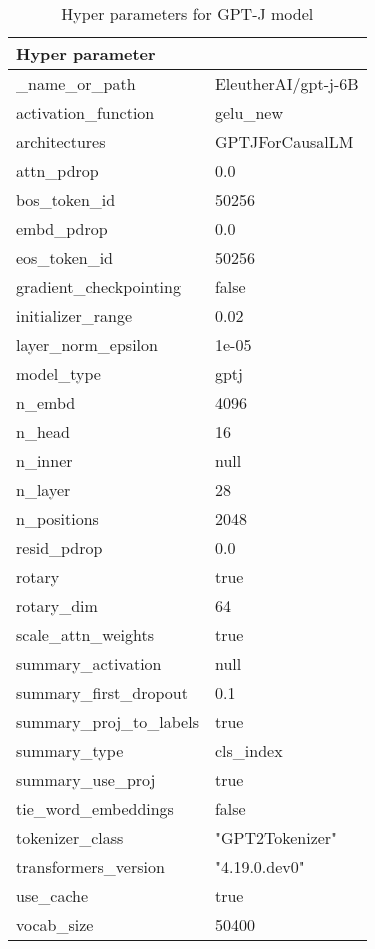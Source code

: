 \begin{table}
    \def\arraystretch{1.5}
    \small
    \centering
    \caption{Hyper parameters for GPT-J model}
    \label{tab:inclusion-exclusion-criteria}
    \begin{tabularx}{\textwidth}{XX}
        \toprule
        \textbf{Hyper parameter} & \\
        \midrule
        \_name\_or\_path & EleutherAI/gpt-j-6B\\
        activation\_function & gelu\_new\\
        architectures & GPTJForCausalLM\\
        attn\_pdrop & 0.0\\
        bos\_token\_id & 50256\\
        embd\_pdrop & 0.0\\
        eos\_token\_id & 50256\\
        gradient\_checkpointing & false\\
        initializer\_range & 0.02\\
        layer\_norm\_epsilon & 1e-05\\
        model\_type & gptj\\
        n\_embd & 4096\\
        n\_head & 16\\
        n\_inner & null\\
        n\_layer & 28\\
        n\_positions & 2048\\
        resid\_pdrop & 0.0\\
        rotary & true\\
        rotary\_dim & 64\\
        scale\_attn\_weights & true\\
        summary\_activation & null\\
        summary\_first\_dropout & 0.1\\
        summary\_proj\_to\_labels & true\\
        summary\_type & cls\_index\\
        summary\_use\_proj & true\\
        tie\_word\_embeddings & false\\
        tokenizer\_class & "GPT2Tokenizer"\\
        transformers\_version & "4.19.0.dev0"\\
        use\_cache & true\\
        vocab\_size & 50400\\
        \bottomrule
    \end{tabularx}
\end{table}


